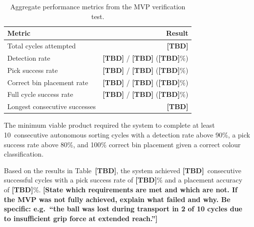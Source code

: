 \begin{table}[H]
    \centering
    \renewcommand{\arraystretch}{1.3}
    \begin{tabular}{|l|r|}
        \hline
        \textbf{Metric} & \textbf{Result} \\
        \hline
        Total cycles attempted &
        \textbf{[TBD]} \\
        \hline
        Detection rate &
        \textbf{[TBD]} / \textbf{[TBD]}
        (\textbf{[TBD]}\%) \\
        \hline
        Pick success rate &
        \textbf{[TBD]} / \textbf{[TBD]}
        (\textbf{[TBD]}\%) \\
        \hline
        Correct bin placement rate &
        \textbf{[TBD]} / \textbf{[TBD]}
        (\textbf{[TBD]}\%) \\
        \hline
        Full cycle success rate &
        \textbf{[TBD]} / \textbf{[TBD]}
        (\textbf{[TBD]}\%) \\
        \hline
        Longest consecutive successes &
        \textbf{[TBD]} \\
        \hline
    \end{tabular}
    \caption{Aggregate performance metrics from the MVP
    verification test.}
\end{table}



The minimum viable product required the system to complete at
least 10~consecutive autonomous sorting cycles with a detection
rate above 90\%, a pick success rate above 80\%, and 100\%
correct bin placement given a correct colour classification.

Based on the results in Table~\textbf{[TBD]}, the system
achieved \textbf{[TBD]}~consecutive successful cycles with a
pick success rate of \textbf{[TBD]}\% and a placement accuracy
of \textbf{[TBD]}\%. \textbf{[State which requirements are met
and which are not. If the MVP was not fully achieved, explain
what failed and why. Be specific: e.g.\ ``the ball was lost
during transport in 2 of 10 cycles due to insufficient grip
force at extended reach.'']}
